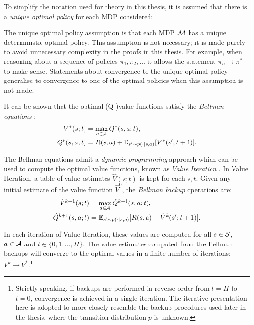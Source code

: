     To simplify the notation used for theory in this thesis, it is assumed that there is a \textit{unique optimal policy} for each MDP considered:
    \begin{assumption}
        \label{ass:2:unique_optimal_policy} 
        The \textnormal{unique optimal policy assumption} is that each MDP $\mathcal{M}$ has a unique deterministic optimal policy. This assumption is not necessary; it is made purely to avoid unnecessary complexity in the proofs in this thesis. For example, when reasoning about a sequence of policies $\pi_1,\pi_2,\ldots$ it allows the statement $\pi_n \rightarrow \pi^*$ to make sense. Statements about convergence to the unique optimal policy generalise to convergence to one of the optimal policies when this assumption is not made.
    \end{assumption}

    It can be shown that the optimal (Q-)value functions satisfy the \textit{Bellman equations} \cite{dp,kolobov}:
    \begin{align}
        V^*(s;t) &= \max_{a\in\mathcal{A}} Q^*(s,a;t), \label{eq:2:bellman_opt_v} \\
        Q^*(s,a;t) &= R(s,a) + \mathbb{E}_{s'\sim p(\cdot|s,a)} [V^*(s';t+1)]. \label{eq:2:bellman_opt_q}
    \end{align} 

    The Bellman equations admit a \textit{dynamic programming} approach which can be used to compute the optimal value functions, known as \textit{Value Iteration} \cite{dp,kolobov}. In Value Iteration, a table of value estimates $\hat{V}(s;t)$ is kept for each $s,t$. Given any initial estimate of the value function $\hat{V}^{0}$, the \textit{Bellman backup} operations are:
    \begin{align}
        \hat{V}^{k+1}(s;t) &= \max_{a\in\mathcal{A}} \hat{Q}^{k+1}(s,a;t), \label{eq:2:value_iter_v_backup} \\
        \hat{Q}^{k+1}(s,a;t) &= \mathbb{E}_{s'\sim p(\cdot|s,a)} [R(s,a) + \hat{V}^k(s';t+1)]. \label{eq:2:value_iter_q_backup}
    \end{align}

    In each iteration of Value Iteration, these values are computed for all $s\in\mathcal{S}$, $a\in\mathcal{A}$ and $t\in\{0,1,\ldots,H\}$. The value estimates computed from the Bellman backups will converge to the optimal values in a finite number of iterations: $V^{k}\rightarrow V^*$.\footnote{Strictly speaking, if backups are performed in reverse order from $t=H$ to $t=0$, convergence is achieved in a single iteration. The iterative presentation here is adopted to more closely resemble the backup procedures used later in the thesis, where the transition distribution $p$ is unknown.}









